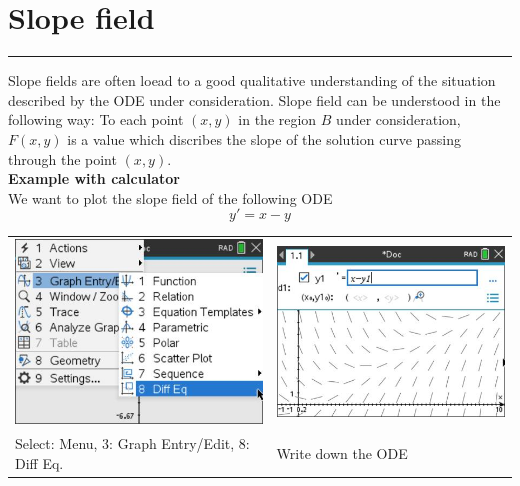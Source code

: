 \section{Slope field}
\noindent\rule[\linienAbstand]{\linewidth}{\linienDickeDick}
Slope fields are often loead to a good qualitative understanding of the situation described by the ODE under consideration.
Slope field can be understood in the following way: To each point $(x, y)$ in the region $B$ under consideration, $F(x, y)$ is a value which discribes the slope of the solution curve passing through the point $(x, y)$.\\

\textbf{Example with calculator}\\
We want to plot the slope field of the following ODE
\begin{equation}
  y' = x - y
\end{equation}
\begin{table}[H]
  \setlength{\tabcolsep}{0.2em}
  \footnotesize
  \begin{tabular}{p{}@{\hskip 1em}p{}}
    \includegraphics[width=\linewidth]{Pics/1.5.1.jpg} & \includegraphics[width=\linewidth]{Pics/1.5.2.jpg} \\
    Select: Menu, 3: Graph Entry/Edit, 8: Diff Eq. & Write down the ODE
  \end{tabular}
\end{table}
